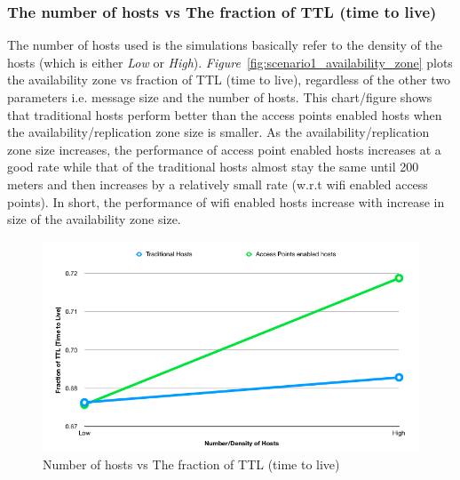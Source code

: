 {\subsubsection{The number of hosts vs The fraction of TTL (time to live)}
The number of hosts used is the simulations basically refer to the density of the hosts (which is either \textit{Low} or \textit{High}). \emph{Figure}~\ref{fig:scenario1_availability_zone} plots the availability zone vs fraction of TTL (time to live), regardless of the other two parameters i.e. message size and the number of hosts. This chart/figure shows that traditional hosts perform better than the access points enabled hosts when the availability/replication zone size is smaller. As the availability/replication zone size increases, the performance of access point enabled hosts increases at a good rate while that of the traditional hosts almost stay the same until 200 meters and then increases by a relatively small rate (w.r.t wifi enabled access points). In short, the performance of wifi enabled hosts increase with increase in size of the availability zone size.
\begin{figure}[h]
  \centering
  \includegraphics[scale=0.4]{./figures/scenario1_hosts_count}
  \caption{Number of hosts vs The fraction of TTL (time to live)}
  \label{fig:scenario1_number_of_hosts}
\end{figure}
\newpage
}
